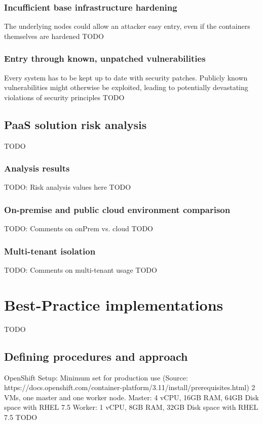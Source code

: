 \subsection{Incufficient base infrastructure hardening}
The underlying nodes could allow an attacker easy entry, even if the containers themselves are hardened
TODO

\subsection{Entry through known, unpatched vulnerabilities}
Every system has to be kept up to date with  security patches. Publicly known vulnerabilities might otherwise be exploited, leading to potentially devastating violations of security principles
TODO

\section{PaaS solution risk analysis}
TODO

\subsection{Analysis results}
TODO: Risk analysis values here
TODO

\subsection{On-premise and public cloud environment comparison}
TODO: Comments on onPrem vs. cloud
TODO

\subsection{Multi-tenant isolation}
TODO: Comments on multi-tenant usage
TODO

\chapter{Best-Practice implementations}
TODO

\section{Defining procedures and approach}
OpenShift Setup: Minimum set for production use (Source: https://docs.openshift.com/container-platform/3.11/install/prerequisites.html)
2 VMs, one master and one worker node.
Master: 4 vCPU, 16GB RAM, 64GB Disk space with RHEL 7.5
Worker: 1 vCPU, 8GB RAM, 32GB Disk space with RHEL 7.5
TODO

